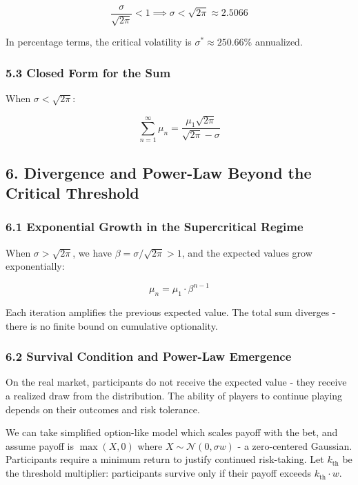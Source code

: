\documentclass[
  11pt,
  openany]{article}
\begin{document}
\[\frac{\sigma}{\sqrt{2\pi}} < 1 \implies \sigma < \sqrt{2\pi} \approx 2.5066\]

In percentage terms, the critical volatility is
\(\sigma^* \approx 250.66\%\) annualized.

\subsubsection{5.3 Closed Form for the
Sum}\label{closed-form-for-the-sum}

When \(\sigma < \sqrt{2\pi}\):

\[\sum_{n=1}^{\infty} \mu_n = \frac{\mu_1 \sqrt{2\pi}}{\sqrt{2\pi} - \sigma}\]

\subsection{6. Divergence and Power-Law Beyond the Critical
Threshold}\label{divergence-and-power-law-beyond-the-critical-threshold}

\subsubsection{6.1 Exponential Growth in the Supercritical
Regime}\label{exponential-growth-in-the-supercritical-regime}

When \(\sigma > \sqrt{2\pi}\), we have
\(\beta = \sigma/\sqrt{2\pi} > 1\), and the expected values grow
exponentially:

\[\mu_n = \mu_1 \cdot \beta^{n-1}\]

Each iteration amplifies the previous expected value. The total sum
diverges - there is no finite bound on cumulative optionality.

\subsubsection{6.2 Survival Condition and Power-Law
Emergence}\label{survival-condition-and-power-law-emergence}

On the real market, participants do not receive the expected value -
they receive a realized draw from the distribution. The ability of
players to continue playing depends on their outcomes and risk
tolerance.

We can take simplified option-like model which scales payoff with the
bet, and assume payoff is \(\max(X, 0)\) where
\(X \sim \mathcal{N}(0, \sigma w)\) - a zero-centered Gaussian.
Participants require a minimum return to justify continued risk-taking.
Let \(k_{\text{th}}\) be the threshold multiplier: participants survive
only if their payoff exceeds \(k_{\text{th}} \cdot w\).
\end{document}
